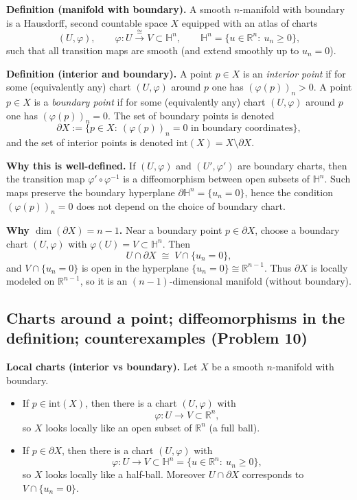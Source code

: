 \documentclass[12pt,a4paper]{article}
\theoremstyle{plain}
\theoremstyle{definition}      %
\begin{document}
\noindent\textbf{Definition (manifold with boundary).}
A smooth $n$-manifold with boundary is a Hausdorff, second countable space $X$ equipped with an atlas of charts
\[
(U,\varphi),\qquad \varphi:U\stackrel{\cong}{\longrightarrow} V\subset \mathbb{H}^n,
\qquad
\mathbb{H}^n=\{u\in\mathbb{R}^n:\ u_n\ge 0\},
\]
such that all transition maps are smooth (and extend smoothly up to $u_n=0$).

\medskip
\noindent\textbf{Definition (interior and boundary).}
A point $p\in X$ is an \emph{interior point} if for some (equivalently any) chart $(U,\varphi)$ around $p$ one has
$(\varphi(p))_n>0$.
A point $p\in X$ is a \emph{boundary point} if for some (equivalently any) chart $(U,\varphi)$ around $p$ one has
$(\varphi(p))_n=0$.
The set of boundary points is denoted
\[
\partial X := \{p\in X:\ (\varphi(p))_n=0 \text{ in boundary coordinates}\},
\]
and the set of interior points is denoted $\mathrm{int}(X)=X\setminus\partial X$.

\medskip
\noindent\textbf{Why this is well-defined.}
If $(U,\varphi)$ and $(U',\varphi')$ are boundary charts, then the transition map
$\varphi'\circ\varphi^{-1}$ is a diffeomorphism between open subsets of $\mathbb{H}^n$.
Such maps preserve the boundary hyperplane $\partial\mathbb{H}^n=\{u_n=0\}$, hence the condition
$(\varphi(p))_n=0$ does not depend on the choice of boundary chart.

\medskip
\noindent\textbf{Why $\dim(\partial X)=n-1$.}
Near a boundary point $p\in\partial X$, choose a boundary chart $(U,\varphi)$ with $\varphi(U)=V\subset\mathbb{H}^n$.
Then
\[
U\cap \partial X \;\cong\; V\cap \{u_n=0\},
\]
and $V\cap\{u_n=0\}$ is open in the hyperplane $\{u_n=0\}\cong \mathbb{R}^{n-1}$.
Thus $\partial X$ is locally modeled on $\mathbb{R}^{n-1}$, so it is an $(n-1)$-dimensional manifold (without boundary).

\subsection*{Charts around a point; diffeomorphisms in the definition; counterexamples (Problem 10)}

\noindent\textbf{Local charts (interior vs boundary).}
Let $X$ be a smooth $n$-manifold with boundary.

\begin{itemize}
	\item If $p\in \mathrm{int}(X)$, then there is a chart $(U,\varphi)$ with
	\[
	\varphi:U\to V\subset \mathbb{R}^n,
	\]
	so $X$ looks locally like an open subset of $\mathbb{R}^n$ (a full ball).
	
	\item If $p\in \partial X$, then there is a chart $(U,\varphi)$ with
	\[
	\varphi:U\to V\subset \mathbb{H}^n=\{u\in\mathbb{R}^n:\ u_n\ge 0\},
	\]
	so $X$ looks locally like a half-ball. Moreover $U\cap\partial X$ corresponds to $V\cap\{u_n=0\}$.
\end{itemize}
\end{document}
